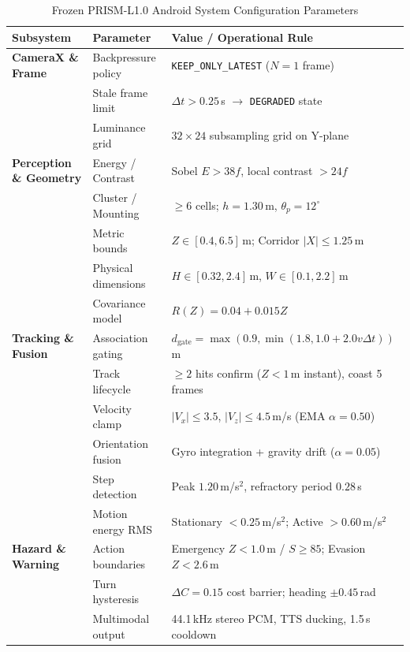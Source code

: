\begin{table}[!t]
\caption{Frozen PRISM-L1.0 Android System Configuration Parameters}
\label{tab:configuration}
\centering
\scriptsize
\setlength{\tabcolsep}{2pt}
\begin{tabularx}{\columnwidth}{p{1.9cm}p{1.7cm}X}
\toprule
\textbf{Subsystem} & \textbf{Parameter} & \textbf{Value / Operational Rule} \\
\midrule
\textbf{CameraX \& Frame}
  & Backpressure policy & \texttt{KEEP\_ONLY\_LATEST} ($N=1$ frame) \\
  & Stale frame limit   & $\Delta t > 0.25$\,s $\to$ \texttt{DEGRADED} state \\
  & Luminance grid      & $32 \times 24$ subsampling grid on Y-plane \\
\midrule
\textbf{Perception \& Geometry}
  & Energy / Contrast   & Sobel $E > 38f$, local contrast $> 24f$ \\
  & Cluster / Mounting  & $\ge 6$ cells; $h = 1.30$\,m, $\theta_p = 12^\circ$ \\
  & Metric bounds       & $Z \in [0.4, 6.5]$\,m; Corridor $|X| \le 1.25$\,m \\
  & Physical dimensions & $H \in [0.32, 2.4]$\,m, $W \in [0.1, 2.2]$\,m \\
  & Covariance model    & $R(Z) = 0.04 + 0.015 Z$ \\
\midrule
\textbf{Tracking \& Fusion}
  & Association gating  & $d_{\text{gate}} = \max(0.9, \min(1.8, 1.0 + 2.0 v \Delta t))$\,m \\
  & Track lifecycle     & $\ge 2$ hits confirm ($Z < 1$\,m instant), coast 5 frames \\
  & Velocity clamp      & $|V_x| \le 3.5$, $|V_z| \le 4.5$\,m/s (EMA $\alpha = 0.50$) \\
  & Orientation fusion  & Gyro integration + gravity drift ($\alpha = 0.05$) \\
  & Step detection      & Peak $1.20$\,m/s$^2$, refractory period $0.28$\,s \\
  & Motion energy RMS   & Stationary $< 0.25$\,m/s$^2$; Active $> 0.60$\,m/s$^2$ \\
\midrule
\textbf{Hazard \& Warning}
  & Action boundaries   & Emergency $Z < 1.0$\,m / $S \ge 85$; Evasion $Z < 2.6$\,m \\
  & Turn hysteresis     & $\Delta C = 0.15$ cost barrier; heading $\pm 0.45$\,rad \\
  & Multimodal output   & 44.1\,kHz stereo PCM, TTS ducking, 1.5\,s cooldown \\
\bottomrule
\end{tabularx}
\par{}
\end{table}
